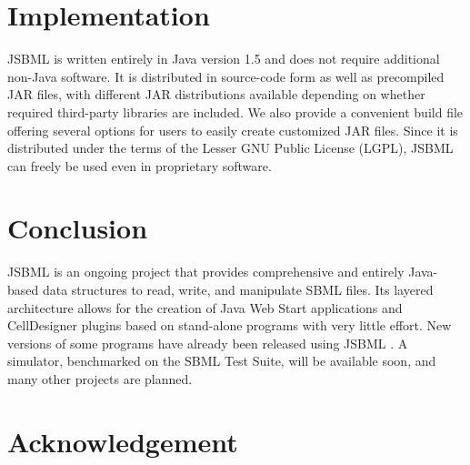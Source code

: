 \documentclass{bioinfo}
\begin{document}
\section{Implementation}

JSBML is written entirely in Java version 1.5 and does
not require additional non-Java software.
It is distributed in source-code form as well as precompiled JAR files,
with different JAR distributions available depending on whether required
third-party libraries are included. We also provide a convenient build
file offering several options for users to easily create customized JAR files.
Since it is distributed under the terms of the Lesser GNU Public License (LGPL), 
JSBML can freely be used even in proprietary software.



\section{Conclusion}

JSBML is an ongoing project that provides comprehensive and entirely Java-based
data structures to read, write, and manipulate SBML files. Its layered
architecture allows for the creation of Java Web Start applications and
CellDesigner plugins based on stand-alone programs with very little effort.
%
New versions of some programs have already been released using JSBML
\citep{Draeger2008, Draeger2009}. A simulator, benchmarked on the SBML Test
Suite, will be available soon, and many other projects are planned.

\section*{Acknowledgement}
\end{document}
